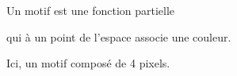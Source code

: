 \documentclass[preview]{standalone}
\begin{document}
\begin{center}
Un motif est une fonction partielle 
        
qui à un point de l'espace associe une couleur.

Ici, un motif composé de 4 pixels.
\end{center}
\end{document}
